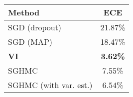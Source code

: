 \begin{tabular}{lc}
\toprule
                Method &             ECE \\
\midrule
         SGD (dropout) &         21.87\% \\
             SGD (MAP) &         18.47\% \\
           \textbf{VI} & \textbf{3.62\%} \\
                 SGHMC &          7.55\% \\
SGHMC (with var. est.) &          6.54\% \\
\bottomrule
\end{tabular}
